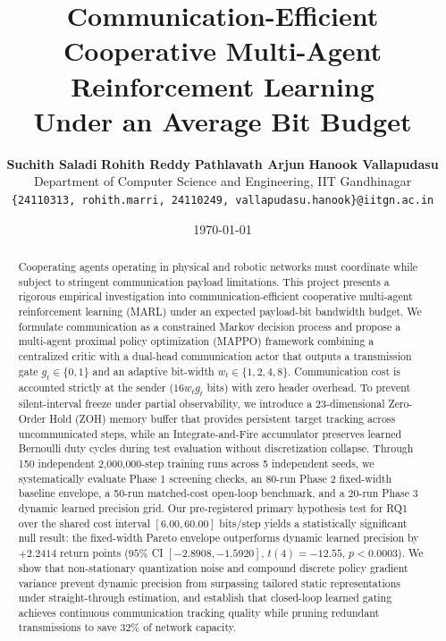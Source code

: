 \documentclass[10pt,twocolumn,letterpaper]{article}
\title{\textbf{\Large Communication-Efficient Cooperative Multi-Agent Reinforcement Learning\\Under an Average Bit Budget}}
\author{
    \textbf{Suchith Saladi} \quad \textbf{Rohith Reddy} \quad \textbf{Pathlavath Arjun} \quad \textbf{Hanook Vallapudasu} \\
    Department of Computer Science and Engineering, IIT Gandhinagar \\
    \texttt{\{24110313, rohith.marri, 24110249, vallapudasu.hanook\}@iitgn.ac.in}
}
\date{\today}
\begin{document}
\maketitle

\begin{abstract}
Cooperating agents operating in physical and robotic networks must coordinate while subject to stringent communication payload limitations. This project presents a rigorous empirical investigation into communication-efficient cooperative multi-agent reinforcement learning (MARL) under an expected payload-bit bandwidth budget. We formulate communication as a constrained Markov decision process and propose a multi-agent proximal policy optimization (MAPPO) framework combining a centralized critic with a dual-head communication actor that outputs a transmission gate $g_t \in \{0, 1\}$ and an adaptive bit-width $w_t \in \{1, 2, 4, 8\}$. Communication cost is accounted strictly at the sender ($16 w_t g_t$ bits) with zero header overhead. To prevent silent-interval freeze under partial observability, we introduce a 23-dimensional Zero-Order Hold (ZOH) memory buffer that provides persistent target tracking across uncommunicated steps, while an Integrate-and-Fire accumulator preserves learned Bernoulli duty cycles during test evaluation without discretization collapse. Through 150 independent 2,000,000-step training runs across 5 independent seeds, we systematically evaluate Phase 1 screening checks, an 80-run Phase 2 fixed-width baseline envelope, a 50-run matched-cost open-loop benchmark, and a 20-run Phase 3 dynamic learned precision grid. Our pre-registered primary hypothesis test for RQ1 over the shared cost interval $[6.00, 60.00]$ bits/step yields a statistically significant null result: the fixed-width Pareto envelope outperforms dynamic learned precision by $+2.2414$ return points ($95\%$ CI $[-2.8908, -1.5920]$, $t(4) = -12.55$, $p < 0.0003$). We show that non-stationary quantization noise and compound discrete policy gradient variance prevent dynamic precision from surpassing tailored static representations under straight-through estimation, and establish that closed-loop learned gating achieves continuous communication tracking quality while pruning redundant transmissions to save $32\%$ of network capacity.
\end{abstract}
\end{document}
